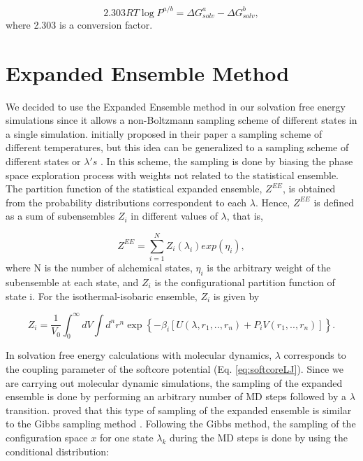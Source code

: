 \begin{equation}
\label{eqn:partcoe}
{2.303RT} \log{P}^{a/b} ={\Delta G_{solv}^{a} - \Delta G_{solv}^{b}},
\end{equation}
where 2.303 is a conversion factor.

\section{Expanded Ensemble Method}\label{ee}

We decided to use the Expanded Ensemble method \cite{lyubartsev} in our solvation free energy simulations since it allows a non-Boltzmann sampling scheme of different states in a single simulation.  initially proposed in their paper a sampling scheme of different temperatures, but this idea can be generalized to a sampling scheme of different states or $\lambda 's$ \cite{escobedo2007}. In this scheme, the sampling is done by biasing the phase space exploration process with weights not related to the statistical ensemble. The partition function of the statistical expanded ensemble, $Z^{EE}$, is obtained from the probability distributions correspondent to each $\lambda$. Hence, $Z^{EE}$ is defined as a sum of subensembles $Z_{i}$ in different values of $\lambda$, that is,

\begin{equation}
Z^{EE} = \sum_{i=1}^{N} Z_{i}(\lambda_{i}) exp(\eta_{i}),
\label{eqn:ee}
\end{equation}   
where N is the number of alchemical states, $\eta_{i}$ is the arbitrary weight of the subensemble at each state, and $Z_{i}$ is the configurational partition function of state i. For the isothermal-isobaric ensemble, $Z_{i}$ is given by

\begin{equation}
Z_{i} = \frac{1}{V_{0}} {\int_{0}^{\infty} dV \int d^{n}r^{n} \exp \left \lbrace -\beta_{i} \left[ U(\lambda, r_{1},..,r_{n}) + P_{i}V(r_{1},..,r_{n}) \right] \right \rbrace}.
\end{equation} 

In solvation free energy calculations with molecular dynamics, $\lambda$ corresponds to the coupling parameter of the softcore potential (Eq. \ref{eq:softcoreLJ}). Since we are carrying out molecular dynamic simulations, the sampling of the expanded ensemble is done by performing an arbitrary number of MD  steps followed by a $\lambda$ transition.  proved that this type of sampling of the expanded ensemble is similar to the Gibbs sampling method \cite{geman1984,liu2002}. Following the Gibbs method, the sampling of the configuration space $x$ for one state $\lambda_{k}$ during the MD steps is done by using the conditional distribution:

